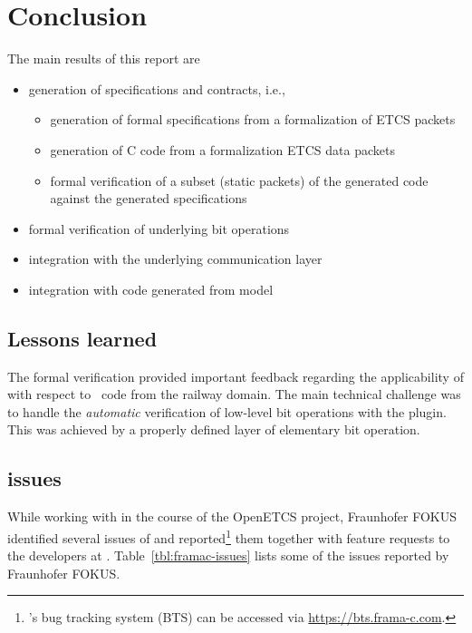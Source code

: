 
\chapter{Conclusion}
\label{cha:conclusions}

The main results of this report are

\begin{itemize}
\item generation of specifications and contracts, i.e.,
\begin{itemize}
\item generation of formal specifications from a formalization of ETCS packets
\item generation of C code from a formalization ETCS data packets
\item formal verification of a subset (static packets) of the generated code against the generated specifications
\end{itemize}
\item formal verification of underlying bit operations
\item integration with the underlying communication layer
\item integration with code generated from \scade model
\end{itemize}

\section{Lessons learned}

The formal verification provided important feedback
regarding the applicability of \framac with respect to
\isoc~code from the railway domain.
The main technical challenge was to handle the \emph{automatic}
verification of low-level bit operations with the \framacwp plugin.
This was achieved by a properly defined layer of elementary bit operation.

\section{\framac issues}

While working with \framac in the course of the OpenETCS project,
Fraunhofer FOKUS identified several issues of \framac and reported\footnote{%
\framac's bug tracking system (BTS) can be accessed via \url{https://bts.frama-c.com}.
} them 
together with feature requests to
the developers at \cealist.
Table~\ref{tbl:framac-issues} lists some of the issues reported by Fraunhofer FOKUS.

